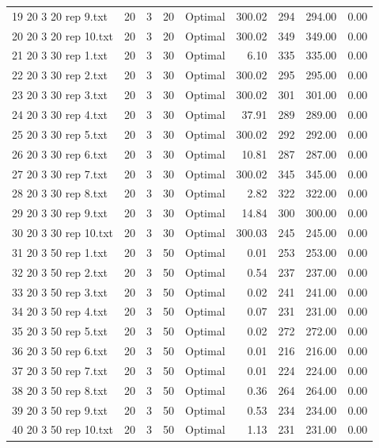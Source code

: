 \begin{longtable}{lrrllrrrr}
19 20 3 20 rep 9.txt & 20 & 3 & 20 & Optimal & 300.02 & 294 & 294.00 &  0.00\\
20 20 3 20 rep 10.txt & 20 & 3 & 20 & Optimal & 300.02 & 349 & 349.00 &  0.00\\
21 20 3 30 rep 1.txt & 20 & 3 & 30 & Optimal &  6.10 & 335 & 335.00 &  0.00\\
22 20 3 30 rep 2.txt & 20 & 3 & 30 & Optimal & 300.02 & 295 & 295.00 &  0.00\\
23 20 3 30 rep 3.txt & 20 & 3 & 30 & Optimal & 300.02 & 301 & 301.00 &  0.00\\
24 20 3 30 rep 4.txt & 20 & 3 & 30 & Optimal & 37.91 & 289 & 289.00 &  0.00\\
25 20 3 30 rep 5.txt & 20 & 3 & 30 & Optimal & 300.02 & 292 & 292.00 &  0.00\\
26 20 3 30 rep 6.txt & 20 & 3 & 30 & Optimal & 10.81 & 287 & 287.00 &  0.00\\
27 20 3 30 rep 7.txt & 20 & 3 & 30 & Optimal & 300.02 & 345 & 345.00 &  0.00\\
28 20 3 30 rep 8.txt & 20 & 3 & 30 & Optimal &  2.82 & 322 & 322.00 &  0.00\\
29 20 3 30 rep 9.txt & 20 & 3 & 30 & Optimal & 14.84 & 300 & 300.00 &  0.00\\
30 20 3 30 rep 10.txt & 20 & 3 & 30 & Optimal & 300.03 & 245 & 245.00 &  0.00\\
31 20 3 50 rep 1.txt & 20 & 3 & 50 & Optimal &  0.01 & 253 & 253.00 &  0.00\\
32 20 3 50 rep 2.txt & 20 & 3 & 50 & Optimal &  0.54 & 237 & 237.00 &  0.00\\
33 20 3 50 rep 3.txt & 20 & 3 & 50 & Optimal &  0.02 & 241 & 241.00 &  0.00\\
34 20 3 50 rep 4.txt & 20 & 3 & 50 & Optimal &  0.07 & 231 & 231.00 &  0.00\\
35 20 3 50 rep 5.txt & 20 & 3 & 50 & Optimal &  0.02 & 272 & 272.00 &  0.00\\
36 20 3 50 rep 6.txt & 20 & 3 & 50 & Optimal &  0.01 & 216 & 216.00 &  0.00\\
37 20 3 50 rep 7.txt & 20 & 3 & 50 & Optimal &  0.01 & 224 & 224.00 &  0.00\\
38 20 3 50 rep 8.txt & 20 & 3 & 50 & Optimal &  0.36 & 264 & 264.00 &  0.00\\
39 20 3 50 rep 9.txt & 20 & 3 & 50 & Optimal &  0.53 & 234 & 234.00 &  0.00\\
40 20 3 50 rep 10.txt & 20 & 3 & 50 & Optimal &  1.13 & 231 & 231.00 &  0.00\\

\end{longtable}
